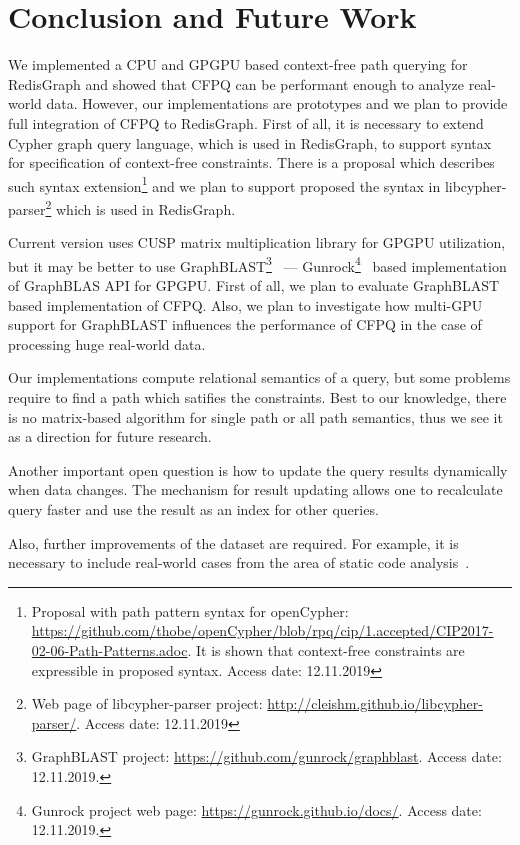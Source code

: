 \section{Conclusion and Future Work}

We implemented a CPU and GPGPU based context-free path querying for RedisGraph and showed that CFPQ can be performant enough to analyze real-world data.
However, our implementations are prototypes and we plan to provide full integration of CFPQ to RedisGraph.
First of all, it is necessary to extend Cypher graph query language, which is used in RedisGraph, to support syntax for specification of context-free constraints.
There is a proposal which describes such syntax extension\footnote{Proposal with path pattern syntax for openCypher: \url{https://github.com/thobe/openCypher/blob/rpq/cip/1.accepted/CIP2017-02-06-Path-Patterns.adoc}. It is shown that context-free constraints are expressible in proposed syntax. Access date: 12.11.2019} and we plan to support proposed the syntax in libcypher-parser\footnote{Web page of libcypher-parser project: \url{http://cleishm.github.io/libcypher-parser/}. Access date: 12.11.2019} which is used in RedisGraph.

Current version uses CUSP matrix multiplication library for GPGPU utilization, but it may be better to use GraphBLAST\footnote{GraphBLAST project: \url{https://github.com/gunrock/graphblast}. Access date: 12.11.2019.}~\cite{yang2019graphblast} --- Gunrock\footnote{Gunrock project web page: \url{https://gunrock.github.io/docs/}. Access date: 12.11.2019.}~\cite{Wang:2017:GGG:3131890.3108140} based implementation of GraphBLAS API for GPGPU.
First of all, we plan to evaluate GraphBLAST based implementation of CFPQ.
Also, we plan to investigate how multi-GPU support for GraphBLAST influences the performance of CFPQ in the case of processing huge real-world data.

Our implementations compute relational semantics of a query, but some problems require to find a path which satifies the constraints.
Best to our knowledge, there is no matrix-based algorithm for single path or all path semantics, thus we see it as a direction for future research.

Another important open question is how to update the query results dynamically when data changes.
The mechanism for result updating allows one to recalculate query faster and use the result as an index for other queries.

Also, further improvements of the dataset are required.
For example, it is necessary to include real-world cases from the area of static code analysis~\cite{Zheng:2008:DAA:1328897.1328464,veduradabatch,LPAR-21:Cauliflower_Solver_Generator_for}.
